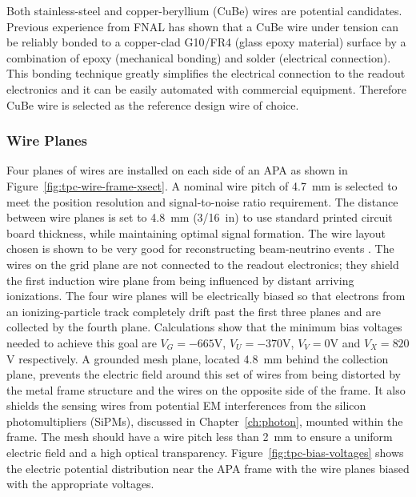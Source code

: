 Both stainless-steel and copper-beryllium (CuBe) wires are potential candidates.  
Previous experience from FNAL \cite{FNAL-proto-APA} has shown that a CuBe wire under 
tension can be reliably bonded to a copper-clad G10/FR4 (glass epoxy material) surface by a combination of  epoxy (mechanical bonding) 
and solder (electrical connection).  This bonding technique greatly simplifies the electrical 
connection to the readout electronics and it can be easily automated 
with commercial equipment.  Therefore CuBe wire is 
selected as the reference design wire of choice.



\subsubsection{Wire Planes}
\label{subsec:fd-ref-wireplanes}


Four planes of wires are installed on each side of an APA as shown in Figure~\ref{fig:tpc-wire-frame-xsect}.
A nominal wire pitch of 4.7~mm is selected to meet the position resolution  and signal-to-noise ratio requirement. The distance between wire planes is set to 4.8~mm (3/16~in) to use standard printed circuit board thickness, while maintaining optimal signal formation.  
%
The wire layout chosen  is shown to be very good for reconstructing beam-neutrino events \cite{wire-orientation}. The wires on the grid plane are not 
connected to the readout electronics; they shield the first induction wire plane from being influenced by distant arriving ionizations. The four wire planes 
will be electrically biased so that electrons from an ionizing-particle
track completely drift past the first three planes and are collected by the 
fourth plane. Calculations show that the minimum bias voltages 
needed to achieve this goal are $V_G= -665$V, $V_U=-370$V, $V_V=0$V and $V_X=820$V 
respectively.  A grounded mesh plane, located 4.8~mm behind the collection plane, prevents the electric field around this set of wires from being distorted by the metal frame structure and the wires on the opposite side of the frame. It also shields the sensing wires from potential EM interferences from the silicon photomultipliers (SiPMs), discussed in Chapter~\ref{ch:photon}, mounted within the frame.  The mesh should have a wire pitch less than 2~mm to ensure a uniform electric field and a high optical transparency.  Figure~\ref{fig:tpc-bias-voltages} shows the electric potential distribution near the APA frame with the wire planes biased with the appropriate voltages. 

